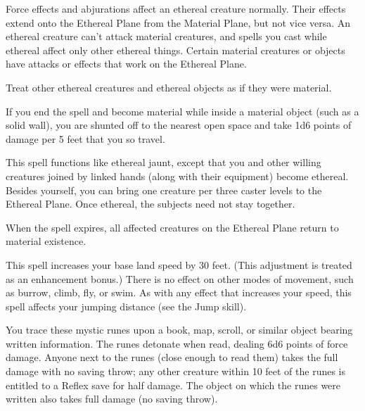\begin{multicols}{2}
\begin{small}
\smallskip\noindent Force effects and abjurations affect an ethereal creature normally. Their effects extend onto the Ethereal Plane from the Material Plane, but not vice versa. An ethereal creature can't attack material creatures, and spells you cast while ethereal affect only other ethereal things. Certain material creatures or objects have attacks or effects that work on the Ethereal Plane.

\smallskip\noindent Treat other ethereal creatures and ethereal objects as if they were material. 

\smallskip\noindent If you end the spell and become material while inside a material object (such as a solid wall), you are shunted off to the nearest open space and take 1d6 points of damage per 5 feet that you so travel.

\noindent This spell functions like ethereal jaunt, except that you and other willing creatures joined by linked hands (along with their equipment) become ethereal. Besides yourself, you can bring one creature per three caster levels to the Ethereal Plane. Once ethereal, the subjects need not stay together.

\smallskip\noindent When the spell expires, all affected creatures on the Ethereal Plane return to material existence.

\noindent This spell increases your base land speed by 30 feet. (This adjustment is treated as an enhancement bonus.) There is no effect on other modes of movement, such as burrow, climb, fly, or swim. As with any effect that increases your speed, this spell affects your jumping distance (see the Jump skill).

\noindent You trace these mystic runes upon a book, map, scroll, or similar object bearing written information. The runes detonate when read, dealing 6d6 points of force damage. Anyone next to the runes (close enough to read them) takes the full damage with no saving throw; any other creature within 10 feet of the runes is entitled to a Reflex save for half damage. The object on which the runes were written also takes full damage (no saving throw).


\end{small}
\end{multicols}
